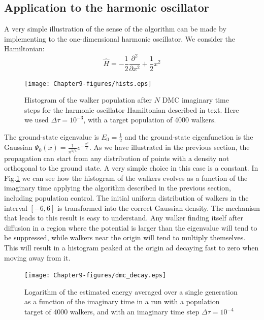 \subsection{Application to the harmonic oscillator}

A very simple illustration of the sense of the algorithm can be made by implementing to the one-dimensional harmonic oscillator. We consider the Hamiltonian:
\begin{equation}
\hat{H}=-\frac{1}{2}\frac{\partial^2}{\partial x^2}+\frac{1}{2}x^2
\end{equation}
\begin{figure}
	\begin{center}
		\texttt{[image: Chapter9-figures/hists.eps]}
	\end{center}
	\caption{Histogram of the walker population after $N$ DMC imaginary time steps for the harmonic oscillator Hamiltonian described in text. Here we used $\Delta\tau=10^{-3}$, with a target population of 4000 walkers.}
	\label{fig.hist}
\end{figure}
The ground-state eigenvalue is $E_0=\tfrac{1}{2}$ and the ground-state eigenfunction is the Gaussian $\Psi_0(x)=\frac{1}{\pi^{1/4}}e^{-\frac{x^2}{2}}$. As we have illustrated in the previous section, the propagation can start from any distribution of points with a density not orthogonal to the ground state. A very simple choice in this case is a constant. In Fig.\ref{fig.hist} we can see how the histogram of the walkers evolves as a function of the imaginary time applying the algorithm described in the previous section, including population control. The initial uniform distribution of walkers in the interval $[-6,6]$ is transformed into the correct Gaussian density. The mechanism that leads to this result is easy to understand. Any walker finding itself after diffusion in a region where the potential is larger than the eigenvalue will tend to be suppressed, while walkers near the origin will tend to multiply themselves. This will result in a histogram peaked at the origin ad decaying fast to zero when moving away from it.
\begin{figure}
	\begin{center}
		\texttt{[image: Chapter9-figures/dmc\_decay.eps]}
	\end{center}
	\caption{Logarithm of the estimated energy averaged over a single generation as a function of the imaginary time in a run with a population target of 4000 walkers, and with an imaginary time step $\Delta\tau=10^{-4}$}
	\label{fig.decay}
\end{figure}



